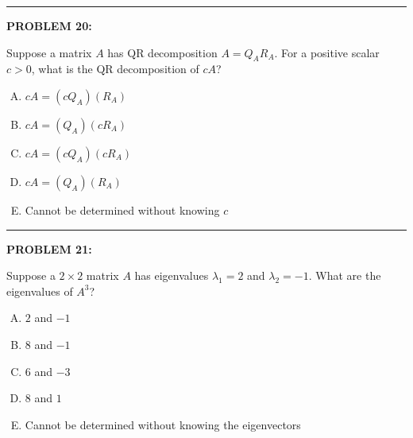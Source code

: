 \documentclass[12pt]{amsart}
\newcommand{\divider}{
  \vspace{-1em} %
  \noindent
  \raisebox{-0.15ex}{\textbullet}%
  \hspace{0.5em}%
  \rule[0.5ex]{0.95\textwidth}{1.0pt}%
  \hspace{0.5em}%
  \raisebox{-0.15ex}{\textbullet}%
  \vspace{0em} %
}
\begin{document}
\divider


{\bf PROBLEM 20:}

Suppose a matrix $A$ has QR decomposition $A = Q_AR_A$. For a positive scalar $c > 0$, what is the QR decomposition of $cA$?

\begin{enumerate}[(A)]
\item $cA = (cQ_A)(R_A)$
\item $cA = (Q_A)(cR_A)$
\item $cA = (cQ_A)(cR_A)$
\item $cA = (Q_A)(R_A)$ 
\item Cannot be determined without knowing $c$
\end{enumerate}

\divider


{\bf PROBLEM 21:}

Suppose a $2 \times 2$ matrix $A$ has eigenvalues $\lambda_1 = 2$ and $\lambda_2 = -1$. What are the eigenvalues of $A^3$?

\begin{enumerate}[(A)]
\item $2$ and $-1$
\item $8$ and $-1$
\item $6$ and $-3$
\item $8$ and $1$
\item Cannot be determined without knowing the eigenvectors
\end{enumerate}
\end{document}
